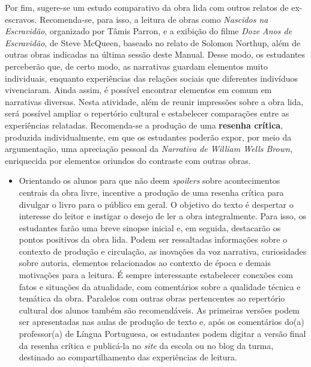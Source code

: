 \documentclass[11pt]{extarticle}
\begin{document}
Por fim, sugere-se um estudo comparativo da obra lida com
outros relatos de ex-escravos. Recomenda-se, para isso, a leitura de
obras como \emph{Nascidos na Escravidão}, organizado por Tâmis Parron, e
a exibição do filme \emph{Doze Anos de Escravidão}, de Steve McQueen,
baseado no relato de Solomon Northup, além de outras obras indicadas na
última sessão deste Manual. Desse modo, os estudantes perceberão que, de
certo modo, as narrativas guardam elementos muito individuais, enquanto
experiências das relações sociais que diferentes indivíduos vivenciaram.
Ainda assim, é possível encontrar elementos em comum em narrativas
diversas. Nesta atividade, além de reunir impressões sobre a obra lida,
será possível ampliar o repertório cultural e estabelecer comparações
entre as experiências relatadas. Recomenda-se a produção de uma
\textbf{resenha crítica}, produzida individualmente, em que os
estudantes poderão expor, por meio da argumentação, uma apreciação
pessoal da \emph{Narrativa de William Wells Brown}, enriquecida por
elementos oriundos do contraste com outras obras.


\begin{itemize}
\item
  Orientando os alunos para que não deem \emph{spoilers} sobre
  acontecimentos centrais da obra livre, incentive a produção de uma
  resenha crítica para divulgar o livro para o público em geral. O
  objetivo do texto é despertar o interesse do leitor e instigar o
  desejo de ler a obra integralmente. Para isso, os estudantes farão uma
  breve sinopse inicial e, em seguida, destacarão os pontos positivos da
  obra lida. Podem ser ressaltadas informações sobre o contexto de
  produção e circulação, as inovações da voz narrativa, curiosidades
  sobre autoria, elementos relacionados ao contexto de época e demais
  motivações para a leitura. É sempre interessante estabelecer conexões
  com fatos e situações da atualidade, com comentários sobre a qualidade
  técnica e temática da obra. Paralelos com outras obras pertencentes ao
  repertório cultural dos alunos também são recomendáveis. As primeiras
  versões podem ser apresentadas nas aulas de produção de texto e, após
  os comentários do(a) professor(a) de Língua Portuguesa, os estudantes
  podem digitar a versão final da resenha crítica e publicá-la no
  \emph{site} da escola ou no blog da turma, destinado ao
  compartilhamento das experiências de leitura.
\end{itemize}
\end{document}
